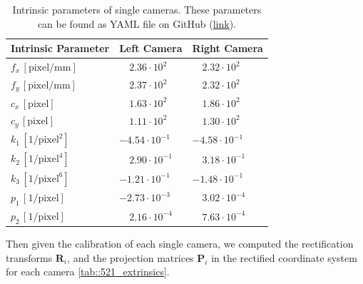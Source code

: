 \begin{table}
	\centering
	\begin{tabular}{lll}
		Intrinsic Parameter & Left Camera & Right Camera\\
		\hline
		$f_x\,[\text{pixel}/\text{mm}]$ & $\quad2.36\cdot10^2$ & $\quad2.32\cdot10^2$ \\
		$f_y\,[\text{pixel}/\text{mm}]$ & $\quad2.37\cdot10^2$ & $\quad2.32\cdot10^2$ \\
		$c_x\,[\text{pixel}]$ & $\quad1.63\cdot10^2$ & $\quad1.86\cdot10^2$ \\
		$c_y\,[\text{pixel}]$ & $\quad1.11\cdot10^2$ & $\quad1.30\cdot10^2$ \\
		$k_1\,[1/\text{pixel}^2]$ & $-4.54\cdot10^{-1}$ & $-4.58\cdot10^{-1}$ \\
		$k_2\,[1/\text{pixel}^4]$ & $\quad2.90\cdot10^{-1}$  & $\quad3.18\cdot10^{-1}$  \\
		$k_3\,[1/\text{pixel}^6]$ & $-1.21\cdot10^{-1}$ & $-1.48\cdot10^{-1}$ \\
		$p_1\,[1/\text{pixel}]$ & $-2.73\cdot10^{-3}$ & $\quad3.02\cdot10^{-4}$  \\
		$p_2\,[1/\text{pixel}]$ & $\quad2.16\cdot10^{-4}$  & $\quad7.63\cdot10^{-4}$		
	\end{tabular}
	\caption{Intrinsic parameters of single cameras. These parameters can be found as YAML file on GitHub (\href{https://github.com/mhubii/nmpc_pattern_generator/tree/master/libs/io_module}{link}).\label{tab::521_intrinsics}}
\end{table}
Then given the calibration of each single camera, we computed the rectification transforms $\bm{R}_i$, and the projection matrices $\bm{P}_i$ in the rectified coordinate system for each camera \ref{tab::521_extrinsics}.
